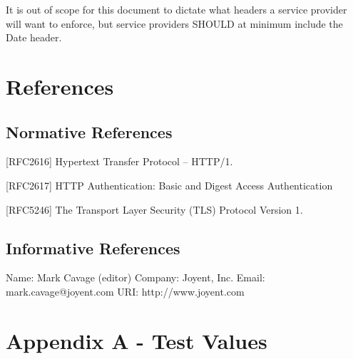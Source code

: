 It is out of scope for this document to dictate what headers a service provider will want to enforce, but service providers S\+H\+O\+U\+L\+D at minimum include the {\ttfamily Date} header.

\section*{References}

\subsection*{Normative References}


\begin{DoxyItemize}
\item \mbox{[}R\+F\+C2616\mbox{]} Hypertext Transfer Protocol -- H\+T\+T\+P/1.
\item \mbox{[}R\+F\+C2617\mbox{]} H\+T\+T\+P Authentication\+: Basic and Digest Access Authentication
\item \mbox{[}R\+F\+C5246\mbox{]} The Transport Layer Security (T\+L\+S) Protocol Version 1.
\end{DoxyItemize}

\subsection*{Informative References}

\begin{DoxyVerb}Name: Mark Cavage (editor)
Company: Joyent, Inc.
Email: mark.cavage@joyent.com
URI: http://www.joyent.com
\end{DoxyVerb}


\section*{Appendix A -\/ Test Values}


